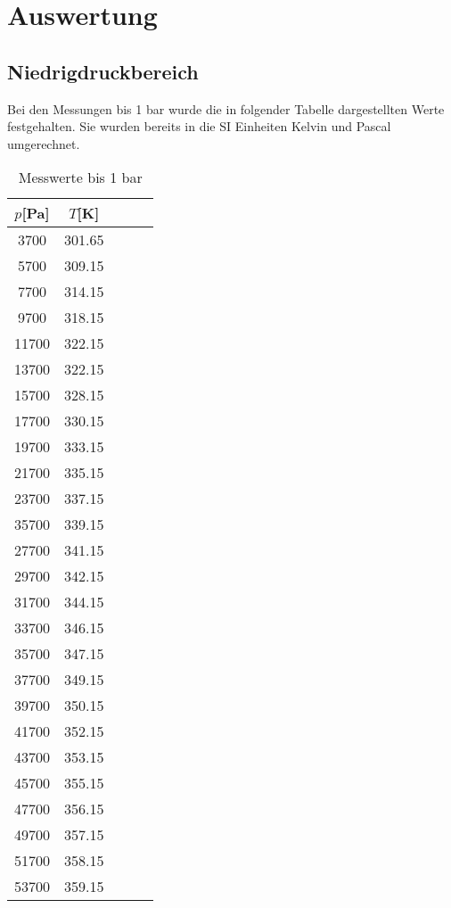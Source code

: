 \section{Auswertung}
\label{sec:Auswertung}
\subsection{Niedrigdruckbereich}

  Bei den Messungen bis 1 bar wurde die in folgender Tabelle dargestellten Werte festgehalten. Sie
  wurden bereits in die SI Einheiten Kelvin und Pascal umgerechnet.
  \begin{table}[H]
    \centering
   \caption{Messwerte bis 1 bar}
   \label{tab:data}
   \begin{tabular}{c c c c c}
   \toprule
    $p$[Pa] & $T$[K] \\
    \midrule
      3700 &   301.65 \\  
      5700 &   309.15 \\  
      7700 &   314.15 \\  
      9700 &   318.15 \\ 
      11700 &   322.15 \\ 
      13700 &   322.15 \\ 
      15700 &   328.15 \\ 
      17700 &   330.15 \\ 
      19700 &   333.15 \\ 
      21700 &   335.15 \\ 
      23700 &   337.15 \\ 
      35700 &   339.15 \\ 
      27700 &   341.15 \\ 
      29700 &   342.15 \\ 
      31700 &   344.15 \\ 
      33700 &   346.15 \\ 
      35700 &   347.15 \\ 
      37700 &   349.15 \\
      39700 &   350.15 \\ 
      41700 &   352.15 \\ 
      43700 &   353.15 \\ 
      45700 &   355.15 \\ 
      47700 &   356.15 \\ 
      49700 &   357.15 \\ 
      51700 &   358.15 \\ 
      53700 &   359.15 \\ 

\end{tabular}
\end{table}
